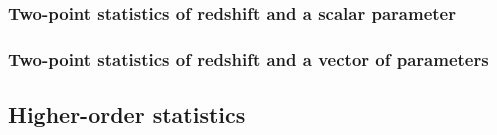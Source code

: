 \documentclass[12pt, onecolumn]{emulateapj}
\begin{document}
%
%
%
%
%
%
%
%
%
%



\subsubsection{Two-point statistics of redshift and a scalar parameter}
\subsubsection{Two-point statistics of redshift and a vector of parameters}
\subsection{Higher-order statistics}




\end{document}
